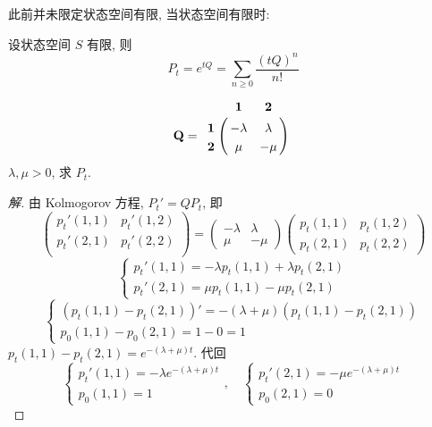 此前并未限定状态空间有限, 当状态空间有限时:

\begin{corollary}
    设状态空间 $S$ 有限, 则
    \[
    P_t=e^{tQ}=\sum_{n\geq 0}\frac{(tQ)^n}{n!}
    \]
\end{corollary}

\begin{example}[两状态的MC]
    \begin{align*}
        \mathbf{Q}=~
        \bordermatrix{
        &\bf1&\bf2 \cr
        \bf1& -\lambda  & \lambda \cr
        \bf2& \mu & -\mu  \cr
        }~
    \end{align*}
    $\lambda,\mu >0$, 求 $P_t$.
\end{example}

\begin{proof}[解]
    由 Kolmogorov 方程, $P_t'=QP_t$, 即
    \[
    \begin{pmatrix}
        p_t'(1,1) & p_t'(1,2)\\
        p_t'(2,1) & p_t'(2,2)\\
    \end{pmatrix}=
    \begin{pmatrix}
        -\lambda & \lambda\\
        \mu & -\mu
    \end{pmatrix}
    \begin{pmatrix}
        p_t(1,1) & p_t(1,2)\\
        p_t(2,1) & p_t(2,2)
    \end{pmatrix}
    \]
    \[
    \begin{cases}
        p_t'(1,1)=-\lambda p_t(1,1) +\lambda p_t(2,1)\\
        p_t'(2,1)=\mu p_t(1,1)-\mu p_t(2,1)
    \end{cases}
    \]
    \[
    \begin{cases}
        (p_t(1,1)-p_t(2,1))' =-(\lambda+\mu) (p_t(1,1)-p_t(2,1))\\
        p_0(1,1)-p_0(2,1)=1-0=1
    \end{cases}
    \]
    $p_t(1,1)-p_t(2,1)=e^{-(\lambda+\mu)t}$. 代回
    \[
    \begin{cases}
        p_t'(1,1)=-\lambda e^{-(\lambda+\mu)t}\\
        p_0(1,1)=1
    \end{cases},\quad
    \begin{cases}
        p_t'(2,1)=-\mu e^{-(\lambda+\mu)t}\\
        p_0(2,1)=0
    \end{cases}
\]
\end{proof}
